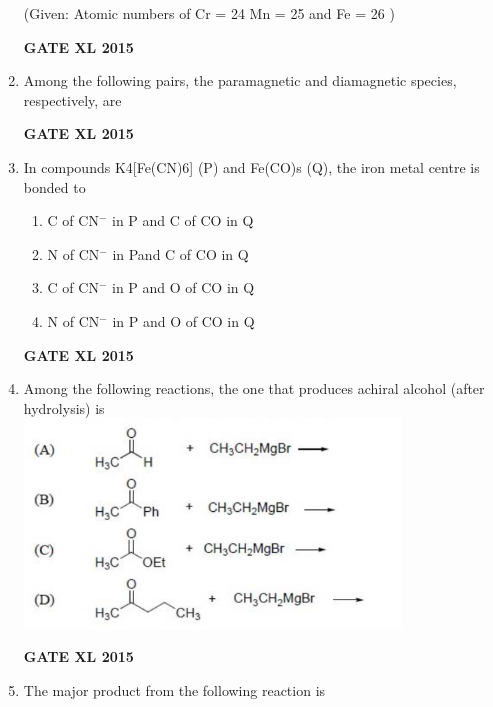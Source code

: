 \documentclass[journal,12pt,onecolumn]{IEEEtran}
\begin{document}
\begin{enumerate}
(Given: Atomic numbers of Cr = 24 Mn = 25 and Fe = 26 )
    \begin{enumerate}
    \end{enumerate}
\begin{flushright}\textbf{GATE XL 2015}\end{flushright}
\item Among the following pairs, the paramagnetic and diamagnetic species, respectively, are
    \begin{enumerate}
    \end{enumerate}
\begin{flushright}\textbf{GATE XL 2015}\end{flushright}
\item In compounds K4[Fe(CN)6] (P) and Fe(CO)s (Q), the iron metal centre is bonded to
    \begin{enumerate}
            \item C of CN$^-$ in P and C of CO in Q
            \item N of CN$^-$ in Pand C of CO in Q
            \item C of CN$^-$ in P and O of CO in Q
            \item N of CN$^-$ in P and O of CO in Q
    \end{enumerate}
\begin{flushright}\textbf{GATE XL 2015}\end{flushright}
\item  Among the following reactions, the one that produces achiral alcohol (after hydrolysis) is\\
    \includegraphics[width=10cm]{21}
\begin{flushright}\textbf{GATE XL 2015}\end{flushright}
\item The major product from the following reaction is
    

\end{enumerate}
\end{document}
